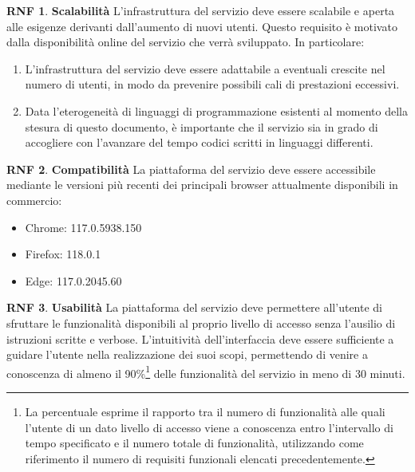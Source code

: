 \documentclass[11pt, a4paper]{article}
\theoremstyle{definition}
\newtheorem{nonfuncreq}{RNF} %
\begin{document}
\begin{nonfuncreq}
\label{scalabilita}
\textbf{Scalabilità }
L'infrastruttura del servizio deve essere scalabile e aperta alle esigenze
derivanti dall'aumento di nuovi utenti. Questo requisito è motivato dalla
disponibilità online del servizio che verrà sviluppato. In particolare:
\begin{enumerate}
    \item L'infrastruttura del servizio deve essere adattabile a eventuali
    crescite nel numero di utenti, in modo da prevenire possibili cali di
    prestazioni eccessivi.

    \item Data l'eterogeneità di linguaggi di programmazione esistenti
    al momento della stesura di questo documento, è importante che il
    servizio sia in grado di accogliere con l'avanzare del tempo codici
    scritti in linguaggi differenti.
\end{enumerate}
\end{nonfuncreq}

\begin{nonfuncreq}
\label{compatibility}
\textbf{Compatibilità }
La piattaforma del servizio deve essere accessibile mediante le versioni
più recenti dei principali browser attualmente disponibili in commercio:
\begin{itemize}
    \item Chrome: 117.0.5938.150
    \item Firefox: 118.0.1
    \item Edge: 117.0.2045.60
\end{itemize}
\end{nonfuncreq}


\begin{nonfuncreq}
\textbf{Usabilità }
La piattaforma del servizio deve permettere all'utente di sfruttare le
funzionalità disponibili al proprio livello di accesso senza l'ausilio di
istruzioni scritte e verbose. L'intuitività dell'interfaccia deve essere
sufficiente a guidare l'utente nella realizzazione dei suoi scopi,
permettendo di venire a conoscenza di almeno il 90\%\footnote{La percentuale
esprime il rapporto tra il numero di funzionalità alle quali l'utente di un
dato livello di accesso viene a conoscenza entro l'intervallo di tempo specificato
e il numero totale di funzionalità, utilizzando come riferimento il
numero di requisiti funzionali elencati precedentemente.} delle funzionalità
del servizio in meno di 30 minuti.
\end{nonfuncreq}
\end{document}
